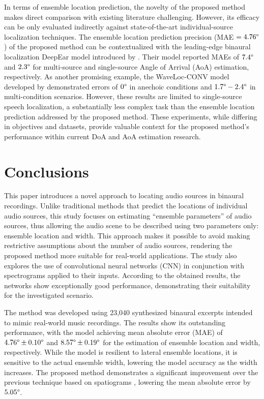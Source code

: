 \documentclass[11pt]{article}
\begin{document}
In terms of ensemble location prediction, the novelty of the proposed method makes direct comparison with existing literature challenging. However, its efficacy can be only evaluated indirectly against state-of-the-art individual-source localization techniques. The ensemble location prediction precision (MAE $=4.76\degree$) of the proposed method can be contextualized with the leading-edge binaural localization DeepEar model introduced by \textcite{yang_deepear_2022}. Their model reported MAEs of $7.4\degree$ and $2.3\degree$ for multi-source and single-source Angle of Arrival (AoA) estimation, respectively. As another promising example, the WaveLoc-CONV model developed by \textcite{vecchiotti_end--end_2019} demonstrated errors of $0\degree$ in anechoic conditions and $1.7\degree-2.4\degree$ in multi-condition scenarios. However, these results are limited to single-source speech localization, a substantially less complex task than the ensemble location prediction addressed by the proposed method. These experiments, while differing in objectives and datasets, provide valuable context for the proposed method's performance within current DoA and AoA estimation research.

\section{Conclusions}
\label{sec:conclusions}

This paper introduces a novel approach to locating audio sources in binaural recordings. Unlike traditional methods that predict the locations of individual audio sources, this study focuses on estimating ``ensemble parameters'' of audio sources, thus allowing the audio scene to be described using two parameters only: ensemble location and width. This approach makes it possible to avoid making restrictive assumptions about the number of audio sources, rendering the proposed method more suitable for real-world applications. The study also explores the use of convolutional neural networks (CNN) in conjunction with spectrograms applied to their inputs. According to the obtained results, the networks show exceptionally good performance, demonstrating their suitability for the investigated scenario.

The method was developed using 23,040 synthesized binaural excerpts intended to mimic real-world music recordings. The results show its outstanding performance, with the model achieving mean absolute error (MAE) of $4.76\degree \pm 0.10\degree$ and $8.57\degree \pm 0.19\degree$ for the estimation of ensemble location and width, respectively. While the model is resilient to lateral ensemble locations, it is sensitive to the actual ensemble width, lowering the model accuracy as the width increases. The proposed method demonstrates a significant improvement over the previous technique based on spatiograms \parencite{antoniuk_blind_2023}, lowering the mean absolute error by $5.05\degree$.
\end{document}
